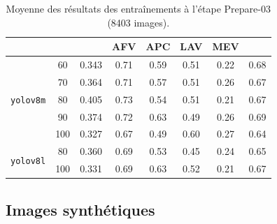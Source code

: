 \begin{table}[H]
\begin{tabular}{|c|c|c|c|c|c|c|c|}
                                          &                                 &                               & AFV                                                & APC                                 & LAV  & MEV  &      \\ \hline
        \multirow{5}{*}{\texttt{yolov8m}}
                                          & 60                              & 0.343                         & 0.71                                               & 0.59                                & 0.51 & 0.22 & 0.68 \\ \cline{2-8}
                                          & 70                              & 0.364                         & 0.71                                               & 0.57                                & 0.51 & 0.26 & 0.67 \\ \cline{2-8}
                                          & 80                              & 0.405                         & 0.73                                               & 0.54                                & 0.51 & 0.21 & 0.67 \\ \cline{2-8}
                                          & 90                              & 0.374                         & 0.72                                               & 0.63                                & 0.49 & 0.26 & 0.69 \\ \cline{2-8}
                                          & 100                             & 0.327                         & 0.67                                               & 0.49                                & 0.60 & 0.27 & 0.64 \\ \hline
        \multirow{2}{*}{\texttt{yolov8l}}
                                          & 80                              & 0.360                         & 0.69                                               & 0.53                                & 0.45 & 0.24 & 0.65 \\ \cline{2-8}
                                          & 100                             & 0.331                         & 0.69                                               & 0.63                                & 0.52 & 0.21 & 0.67 \\ \hline
    \end{tabular}
    \caption{Moyenne des résultats des entraînements à l'étape Prepare-03 (8403 images).}
    \label{tab:results-moy-prepare03}
\end{table}




\subsection{Images synthétiques}

